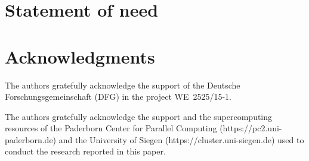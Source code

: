 \documentclass{juliacon}
\begin{document}
\cite{bezanson2017julia}

\section{Statement of need}

\section{Acknowledgments}
The authors gratefully acknowledge the support of the Deutsche Forschungsgemeinschaft (DFG) in the project \mbox{WE~2525/15-1}.

The authors gratefully acknowledge the support and the supercomputing resources of the Paderborn Center for Parallel Computing (https://pc2.uni-paderborn.de) and the University of Siegen (https://cluster.uni-siegen.de) used to conduct the research reported in this paper.



\end{document}
